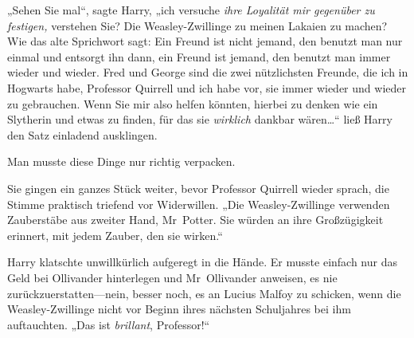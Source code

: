 „Sehen Sie mal“, sagte Harry, „ich versuche \emph{ihre Loyalität mir gegenüber zu festigen,} verstehen Sie? Die Weasley-Zwillinge zu meinen Lakaien zu machen? Wie das alte Sprichwort sagt: Ein Freund ist nicht jemand, den benutzt man nur einmal und entsorgt ihn dann, ein Freund ist jemand, den benutzt man immer wieder und wieder. Fred und George sind die zwei nützlichsten Freunde, die ich in Hogwarts habe, Professor Quirrell und ich habe vor, sie immer wieder und wieder zu gebrauchen. Wenn Sie mir also helfen könnten, hierbei zu denken wie ein Slytherin und etwas zu finden, für das sie \emph{wirklich} dankbar wären…“ ließ Harry den Satz einladend ausklingen.

Man musste diese Dinge nur richtig verpacken.

Sie gingen ein ganzes Stück weiter, bevor Professor Quirrell wieder sprach, die Stimme praktisch triefend vor Widerwillen. „Die Weasley-Zwillinge verwenden Zauberstäbe aus zweiter Hand, Mr~Potter. Sie würden an ihre Großzügigkeit erinnert, mit jedem Zauber, den sie wirken.“

Harry klatschte unwillkürlich aufgeregt in die Hände. Er musste einfach nur das Geld bei Ollivander hinterlegen und Mr~Ollivander anweisen, es nie zurückzuerstatten—nein, besser noch, es an Lucius Malfoy zu schicken, wenn die Weasley-Zwillinge nicht vor Beginn ihres nächsten Schuljahres bei ihm auftauchten. „Das ist \emph{brillant}, Professor!“


